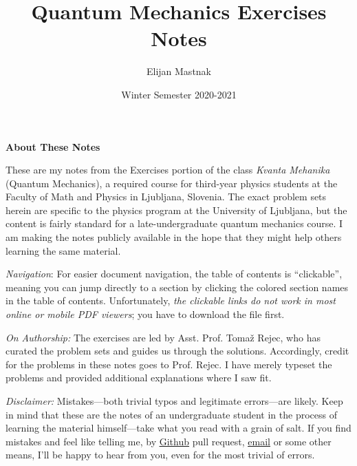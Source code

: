 \documentclass[11pt, a4paper]{article}
\begin{document}
\title{Quantum Mechanics Exercises Notes}
\author{Elijan Mastnak}
\date{Winter Semester 2020-2021}
\maketitle



\begin{center}
\textbf{About These Notes}
\end{center}

These are my notes from the Exercises portion of the class \textit{Kvanta Mehanika} (Quantum Mechanics), a required course for third-year physics students at the Faculty of Math and Physics in Ljubljana, Slovenia. The exact problem sets herein are specific to the physics program at the University of Ljubljana, but the content is fairly standard for a late-undergraduate quantum mechanics course. I am making the notes publicly available in the hope that they might help others learning the same material.

\vspace{2mm}
\textit{Navigation}: For easier document navigation, the table of contents is ``clickable'', meaning you can jump directly to a section by clicking the colored section names in the table of contents. Unfortunately, \textit{the clickable links do not work in most online or mobile PDF viewers}; you have to download the file first.

\vspace{2mm}
\textit{On Authorship:} 
The exercises are led by Asst. Prof. Toma\v{z} Rejec, who has curated the problem sets and guides us through the solutions. Accordingly, credit for the problems in these notes goes to Prof. Rejec. I have merely typeset the problems and provided additional explanations where I saw fit.

\vspace{2mm}
\textit{Disclaimer:} Mistakes---both trivial typos and legitimate errors---are likely. Keep in mind that these are the notes of an undergraduate student in the process of learning the material himself---take what you read with a grain of salt. If you find mistakes and feel like telling me, by \href{https://github.com/ejmastnak/fmf}{\underline{Github}} pull request, \href{mailto:ejmastnak@gmail.com}{\underline{email}} or some other means, I'll be happy to hear from you, even for the most trivial of errors.

\newpage

\tableofcontents
\end{document}
